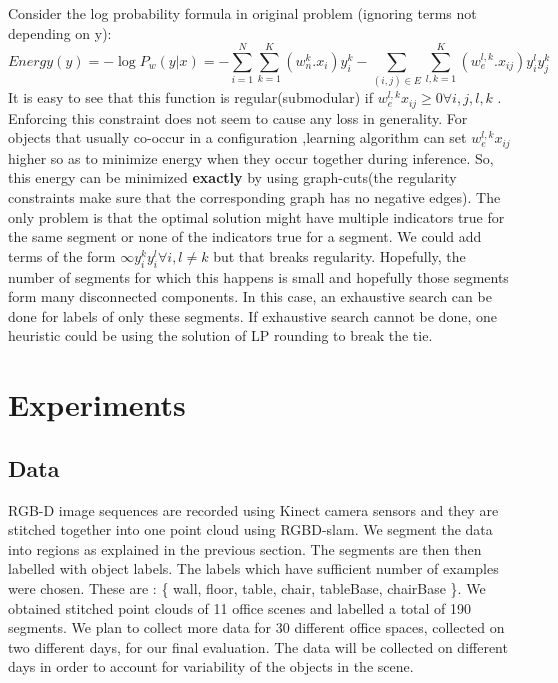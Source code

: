 \documentclass[11pt]{article} %
\begin{document}
Consider the log probability formula in original problem (ignoring terms not depending on y):
\begin{equation}
Energy(y)= -\log P_w (y|x) = -\sum_{i=1}^{N} \sum_{k=1}^{K} (w^{k}_{n}.x_{i})y_{i}^{k} - \sum_{(i,j)\in E} \sum_{l,k=1}^{K} (w_{e}^{l,k}.x_{ij})y_i^l y_j^k
\end{equation}
It is easy to see that this function is regular(submodular) if $w_e^{l,k}x_{ij} \ge 0 \forall i,j,l,k$ . Enforcing this constraint does not seem to cause any loss in generality. For objects that usually co-occur in a configuration ,learning algorithm can set $w_e^{l,k}x_{ij}$ higher so as to minimize energy when they occur together during inference. So, this energy can be minimized {\bf exactly} by using graph-cuts(the regularity constraints make sure that the corresponding graph has no negative edges). The only problem is that the optimal solution might have multiple indicators true for the same segment or none of the indicators true for a segment. We could add terms of the form $\infty y_i^ky_i^l \forall i, l\neq k$ but that breaks regularity.
Hopefully, the number of segments for which this happens is small and hopefully those segments form many disconnected components. In this case, an exhaustive search can be done for labels of only these segments.
If exhaustive search cannot be done, one heuristic could  be using the solution of LP rounding  to break the tie.


     
   \section{Experiments}
   \subsection{Data}
    RGB-D image sequences are recorded using Kinect camera sensors and they are stitched together into one point cloud using RGBD-slam.  We segment the data into regions as explained in the previous section. The segments are then then labelled with object labels. The labels which have sufficient number of examples were chosen. These are : \{ wall, floor, table, chair, tableBase, chairBase \}. We obtained stitched point clouds of 11 office scenes and labelled a total of 190 segments. We plan to collect more data for 30 different office spaces, collected on two different days, for our final evaluation. The data will be collected on different days in order to account for variability of the objects in the scene.
\end{document}
